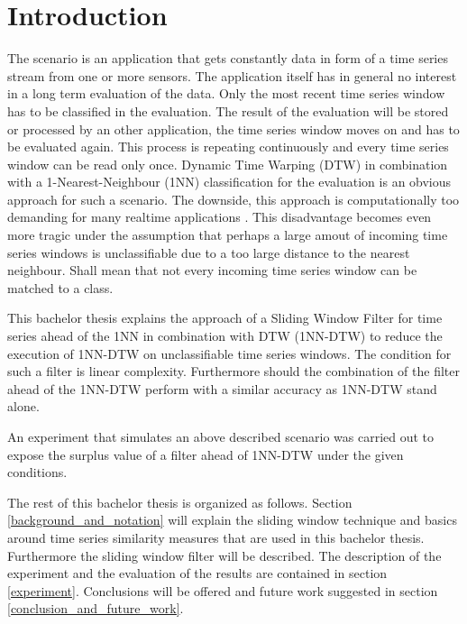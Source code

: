 \section{Introduction} \label{introduction}
The scenario is an application that gets constantly data in form of a time series stream from one or more sensors. The
application itself has in general no interest in a long term evaluation of the data. Only the most recent time series
window has to be classified in the evaluation. The result of the evaluation will be stored or processed by an other
application, the time series window moves on and has to be evaluated again. This process is repeating continuously and
every time series window can be read only once. Dynamic Time Warping (DTW) in combination with a 1-Nearest-Neighbour
(1NN) classification for the evaluation is an obvious approach for such a scenario. The downside, this approach is
computationally too demanding for many realtime applications \cite{xi2006fast}. This disadvantage becomes even more
tragic under the assumption that perhaps a large amout of incoming time series windows is unclassifiable due to a too
large distance to the nearest neighbour. Shall mean that not every incoming time series window can be matched to a
class.

This bachelor thesis explains the approach of a Sliding Window Filter for time series ahead of the 1NN in combination
with DTW (1NN-DTW) to reduce the execution of 1NN-DTW on unclassifiable time series windows. The condition for such a
filter is linear complexity. Furthermore should the combination of the filter ahead of the 1NN-DTW perform with a
similar accuracy as 1NN-DTW stand alone.

An experiment that simulates an above described scenario was carried out to expose the surplus value
of a filter ahead of 1NN-DTW under the given conditions.

The rest of this bachelor thesis is organized as follows. Section \ref{background_and_notation} will explain the sliding
window technique and basics around time series similarity measures that are used in this bachelor thesis. Furthermore
the sliding window filter will be described. The description of the experiment and the evaluation of the results are
contained in section \ref{experiment}. Conclusions will be offered and future work suggested in section
\ref{conclusion_and_future_work}.
